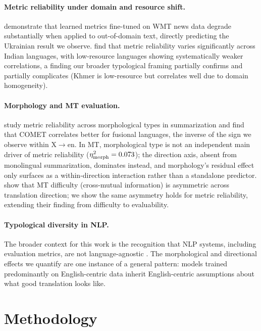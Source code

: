 \documentclass[11pt]{article}
\begin{document}
\paragraph{Metric reliability under domain and resource shift.}
\citet{zouhar2024domain} demonstrate that learned metrics fine-tuned on WMT news data degrade substantially when applied to out-of-domain text, directly predicting the Ukrainian result we observe. \citet{yari2025item} find that metric reliability varies significantly across Indian languages, with low-resource languages showing systematically weaker correlations, a finding our broader typological framing partially confirms and partially complicates (Khmer is low-resource but correlates well due to domain homogeneity).

\paragraph{Morphology and MT evaluation.}
\citet{mondshine2025ngrams} study metric reliability across morphological types in summarization and find that COMET correlates better for fusional languages, the inverse of the sign we observe within X$\to$en. In MT, morphological type is not an independent main driver of metric reliability ($\eta^2_{\text{morph}}=0.073$); the direction axis, absent from monolingual summarization, dominates instead, and morphology's residual effect only surfaces as a within-direction interaction rather than a standalone predictor. \citet{bugliarello2020xmi} show that MT difficulty (cross-mutual information) is asymmetric across translation direction; we show the same asymmetry holds for metric reliability, extending their finding from difficulty to evaluability.

\paragraph{Typological diversity in NLP.}
The broader context for this work is the recognition that NLP systems, including evaluation metrics, are not language-agnostic \cite{costa2022no}. The morphological and directional effects we quantify are one instance of a general pattern: models trained predominantly on English-centric data inherit English-centric assumptions about what good translation looks like.

\section{Methodology}
\label{sec:method}
\end{document}
